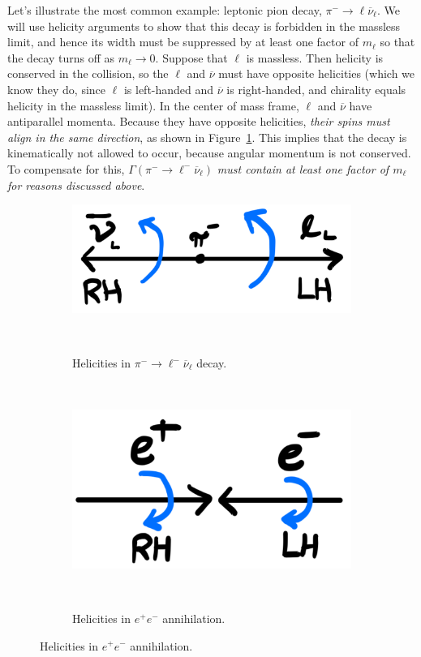 \documentclass[11pt, oneside]{article}   	%
\theoremstyle{definition}
\numberwithin{equation}{subsection}		%
\begin{document}
Let's illustrate the most common example: leptonic pion decay, $\pi^-\rightarrow\ell\overline\nu_\ell$. We will use helicity arguments to show that this decay is forbidden in the massless 
limit, and hence its width must be suppressed by at least one factor of $m_\ell$ so that the decay turns off as $m_\ell\rightarrow 0$. Suppose that $\ell$ is massless. Then helicity 
is conserved in the collision, so the $\ell$ and $\overline\nu$ must have opposite helicities (which we know they do, since $\ell$ is left-handed and $\overline\nu$ is right-handed, and 
chirality equals helicity in the massless limit). In the center of mass frame, $\ell$ and $\overline\nu$ have antiparallel momenta. Because they have opposite helicities, \textit{their spins 
must align in the same direction}, as shown in Figure~\ref{subfig:pi_helicity}. This implies that the decay is kinematically not allowed to occur, because angular momentum is not 
conserved. To compensate for this, $\Gamma(\pi^-\rightarrow\ell^-\overline\nu_\ell)$ \textit{must contain at least one factor of $m_\ell$ for reasons discussed above}. 
\begin{figure}[H]
	\centering
	\begin{subfigure}[t]{.38\textwidth}
		\centering
		\includegraphics[width = .8\textwidth]{helicity_suppression}
		\caption{Helicities in $\pi^-\rightarrow\ell^-\overline\nu_\ell$ decay.}~
		\label{subfig:pi_helicity}
	\end{subfigure}
	~
	\begin{subfigure}[t]{.38\textwidth}
		\centering
		\includegraphics[width = .8\textwidth]{e+e-helicity}
		\caption{Helicities in $e^+ e^-$ annihilation.}~
		\label{subfig:e_helicity}
	\end{subfigure}
\end{figure}
\end{document}
